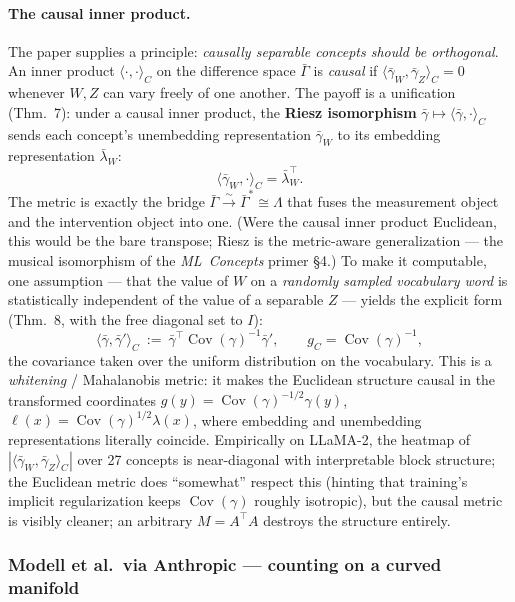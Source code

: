 \paragraph*{The causal inner product.}
The paper supplies a principle: \emph{causally separable concepts should be orthogonal}. An inner product $\langle\cdot,\cdot\rangle_{C}$ on the difference space $\bar\Gamma$ is \emph{causal} if $\langle\bar\gamma_W,\bar\gamma_Z\rangle_{C}=0$ whenever $W,Z$ can vary freely of one another. The payoff is a unification (Thm.~7): under a causal inner product, the \textbf{Riesz isomorphism} $\bar\gamma\mapsto\langle\bar\gamma,\cdot\rangle_{C}$ sends each concept's unembedding representation $\bar\gamma_{W}$ to its embedding representation $\bar\lambda_{W}$:
\[
\langle\bar\gamma_{W},\cdot\rangle_{C}=\bar\lambda_{W}^{\top}.
\]
The metric is exactly the bridge $\bar\Gamma\xrightarrow{\sim}\bar\Gamma^{*}\cong\Lambda$ that fuses the measurement object and the intervention object into one. (Were the causal inner product Euclidean, this would be the bare transpose; Riesz is the metric-aware generalization --- the musical isomorphism of the \emph{ML~Concepts} primer \S4.) To make it computable, one assumption --- that the value of $W$ on a \emph{randomly sampled vocabulary word} is statistically independent of the value of a separable $Z$ --- yields the explicit form (Thm.~8, with the free diagonal set to $I$):
\[
\langle\bar\gamma,\bar\gamma'\rangle_{C}\ :=\ \bar\gamma^{\top}\operatorname{Cov}(\gamma)^{-1}\bar\gamma',
\qquad
g_{C}=\operatorname{Cov}(\gamma)^{-1},
\]
the covariance taken over the uniform distribution on the vocabulary. This is a \emph{whitening} / Mahalanobis metric: it makes the Euclidean structure causal in the transformed coordinates $g(y)=\operatorname{Cov}(\gamma)^{-1/2}\gamma(y)$, $\ell(x)=\operatorname{Cov}(\gamma)^{1/2}\lambda(x)$, where embedding and unembedding representations literally coincide. Empirically on LLaMA-2, the heatmap of $|\langle\bar\gamma_W,\bar\gamma_Z\rangle_{C}|$ over 27 concepts is near-diagonal with interpretable block structure; the Euclidean metric does ``somewhat'' respect this (hinting that training's implicit regularization keeps $\operatorname{Cov}(\gamma)$ roughly isotropic), but the causal metric is visibly cleaner; an arbitrary $M=A^{\top}A$ destroys the structure entirely.

\subsubsection*{Modell et al.\ via Anthropic --- counting on a curved manifold}

